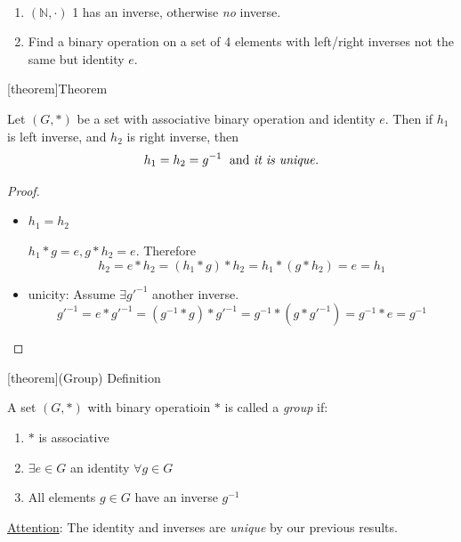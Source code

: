 \documentclass[12pt]{report}
\theoremstyle{definition}
\begin{document}
\begin{ex}
    \,

    \begin{enumerate}[label = (\arabic*)]
        \item $(\mathbb{N}, \cdot)$
            1 has an inverse, otherwise \emph{no} inverse.
        \item Find a binary operation on a set of 4 elements with left/right inverses
            not the same but identity $e$.
    \end{enumerate}
    
\end{ex}

[theorem]{Theorem}
\begin{equal left right inverse}
    Let $(G, *)$ be a set with associative binary operation and identity $e$.
    Then if $h_1$ is left inverse, and $h_2$ is right inverse, then\[
        h_1 = h_2 = g^{-1} \;\text{ and \emph{it is unique}}.
    \]
\end{equal left right inverse}

\begin{proof}
    \;

    \begin{itemize}
            \item $h_1 = h_2$

                $h_1 * g = e, g * h_2 = e$. Therefore\[
                    h_2 = e * h_2 = (h_1 * g) * h_2 = h_1 * (g * h_2) = e = h_1
                \]
            \item unicity: Assume $\exists g'^{-1}$ another inverse.\[
                    g'^{-1} = e * g'^{-1} = (g^{-1} * g) * g'^{-1} 
                    = g^{-1} * (g * g'^{-1}) = g^{-1} * e = g^{-1}
            \]
    \end{itemize}
\end{proof}

[theorem]{(Group) Definition}
\begin{Group Definition}
    A set $(G,*)$ with binary operatioin $*$ is called a \emph{group} if:
    \begin{enumerate}[label = (\arabic*)]
        \item $*$ is associative
        \item $\exists e \in G$ an identity $\forall g \in G$
        \item All elements $g \in G$ have an inverse $g^{-1}$
    \end{enumerate}
    \underline{Attention}: The identity and inverses are \emph{unique} by our previous results.
    
\end{Group Definition}
\end{document}
